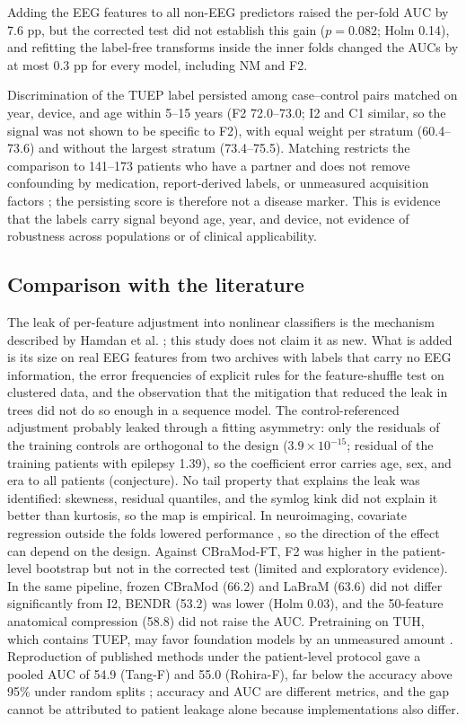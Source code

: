 Adding the EEG features to all non-EEG predictors raised the per-fold AUC by 7.6 pp, but the corrected test did not establish this gain ($p = 0.082$; Holm 0.14), and refitting the label-free transforms inside the inner folds changed the AUCs by at most 0.3 pp for every model, including NM and F2.

Discrimination of the TUEP label persisted among case--control pairs matched on year, device, and age within 5--15 years (F2 72.0--73.0; I2 and C1 similar, so the signal was not shown to be specific to F2), with equal weight per stratum (60.4--73.6) and without the largest stratum (73.4--75.5). Matching restricts the comparison to 141--173 patients who have a partner and does not remove confounding by medication, report-derived labels, or unmeasured acquisition factors \cite{maxion2024}; the persisting score is therefore not a disease marker. This is evidence that the labels carry signal beyond age, year, and device, not evidence of robustness across populations or of clinical applicability.

\subsection*{Comparison with the literature}

The leak of per-feature adjustment into nonlinear classifiers is the mechanism described by Hamdan et al. \cite{hamdan2023}; this study does not claim it as new. What is added is its size on real EEG features from two archives with labels that carry no EEG information, the error frequencies of explicit rules for the feature-shuffle test on clustered data, and the observation that the mitigation that reduced the leak in trees did not do so enough in a sequence model. The control-referenced adjustment probably leaked through a fitting asymmetry: only the residuals of the training controls are orthogonal to the design ($3.9\times10^{-15}$; residual of the training patients with epilepsy 1.39), so the coefficient error carries age, sex, and era to all patients (conjecture). No tail property that explains the leak was identified: skewness, residual quantiles, and the symlog kink did not explain it better than kurtosis, so the map is empirical. In neuroimaging, covariate regression outside the folds lowered performance \cite{rosenblatt2024}, so the direction of the effect can depend on the design.
Against CBraMod-FT, F2 was higher in the patient-level bootstrap but not in the corrected test (limited and exploratory evidence). In the same pipeline, frozen CBraMod (66.2) and LaBraM (63.6) did not differ significantly from I2, BENDR (53.2) was lower (Holm 0.03), and the 50-feature anatomical compression (58.8) did not raise the AUC. Pretraining on TUH, which contains TUEP, may favor foundation models by an unmeasured amount \cite{jiang2024,wang2025cbramod}.
Reproduction of published methods under the patient-level protocol gave a pooled AUC of 54.9 (Tang-F) and 55.0 (Rohira-F), far below the accuracy above 95\% under random splits \cite{rohira2023,tang2024}; accuracy and AUC are different metrics, and the gap cannot be attributed to patient leakage alone because implementations also differ.

